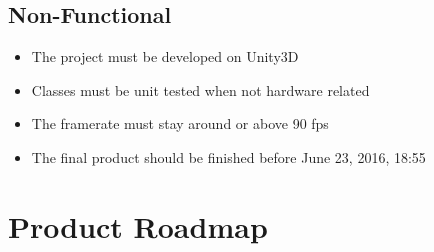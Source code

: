 \documentclass[11pt,a4paper]{report}
\begin{document}
\section{Non-Functional}
\begin{itemize}
\item The project must be developed on Unity3D
\item Classes must be unit tested when not hardware related
\item The framerate must stay around or above 90 fps
\item The final product should be finished before June 23, 2016, 18:55
\end{itemize}

\chapter{Product Roadmap}
\end{document}

